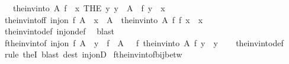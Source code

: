 \begin{isabellebody}
\ \ \ {\isachardoublequoteopen}the{\isacharunderscore}{\kern0pt}inv{\isacharunderscore}{\kern0pt}into\ A\ f\ {\isacharequal}{\kern0pt}\ {\isacharparenleft}{\kern0pt}{\isasymlambda}x{\isachardot}{\kern0pt}\ THE\ y{\isachardot}{\kern0pt}\ y\ {\isasymin}\ A\ {\isasymand}\ f\ y\ {\isacharequal}{\kern0pt}\ x{\isacharparenright}{\kern0pt}{\isachardoublequoteclose}\isanewline
\isanewline
{}\isamarkupfalse%
\ the{\isacharunderscore}{\kern0pt}inv{\isacharunderscore}{\kern0pt}into{\isacharunderscore}{\kern0pt}f{\isacharunderscore}{\kern0pt}f{\isacharcolon}{\kern0pt}\ {\isachardoublequoteopen}inj{\isacharunderscore}{\kern0pt}on\ f\ A\ {\isasymLongrightarrow}\ x\ {\isasymin}\ A\ {\isasymLongrightarrow}\ the{\isacharunderscore}{\kern0pt}inv{\isacharunderscore}{\kern0pt}into\ A\ f\ {\isacharparenleft}{\kern0pt}f\ x{\isacharparenright}{\kern0pt}\ {\isacharequal}{\kern0pt}\ x{\isachardoublequoteclose}\isanewline
%
\isadelimproof
\ \ %
\endisadelimproof
%
\isatagproof
{}\isamarkupfalse%
\ the{\isacharunderscore}{\kern0pt}inv{\isacharunderscore}{\kern0pt}into{\isacharunderscore}{\kern0pt}def\ inj{\isacharunderscore}{\kern0pt}on{\isacharunderscore}{\kern0pt}def\ \isamarkupfalse%
\ blast%
\endisatagproof
{\isafoldproof}%
%
\isadelimproof
\isanewline
%
\endisadelimproof
\isanewline
{}\isamarkupfalse%
\ f{\isacharunderscore}{\kern0pt}the{\isacharunderscore}{\kern0pt}inv{\isacharunderscore}{\kern0pt}into{\isacharunderscore}{\kern0pt}f{\isacharcolon}{\kern0pt}\ {\isachardoublequoteopen}inj{\isacharunderscore}{\kern0pt}on\ f\ A\ {\isasymLongrightarrow}\ y\ {\isasymin}\ f\ {\isacharbackquote}{\kern0pt}\ A\ \ {\isasymLongrightarrow}\ f\ {\isacharparenleft}{\kern0pt}the{\isacharunderscore}{\kern0pt}inv{\isacharunderscore}{\kern0pt}into\ A\ f\ y{\isacharparenright}{\kern0pt}\ {\isacharequal}{\kern0pt}\ y{\isachardoublequoteclose}\isanewline
%
\isadelimproof
\ \ %
\endisadelimproof
%
\isatagproof
{}\isamarkupfalse%
\ the{\isacharunderscore}{\kern0pt}inv{\isacharunderscore}{\kern0pt}into{\isacharunderscore}{\kern0pt}def\isanewline
\ \ \isamarkupfalse%
\ {\isacharparenleft}{\kern0pt}rule\ the{}I{}{\isacharsemicolon}{\kern0pt}\ blast\ dest{\isacharcolon}{\kern0pt}\ inj{\isacharunderscore}{\kern0pt}onD{\isacharparenright}{\kern0pt}%
\endisatagproof
{\isafoldproof}%
%
\isadelimproof
\isanewline
%
\endisadelimproof
\isanewline
{}\isamarkupfalse%
\ f{\isacharunderscore}{\kern0pt}the{\isacharunderscore}{\kern0pt}inv{\isacharunderscore}{\kern0pt}into{\isacharunderscore}{\kern0pt}f{\isacharunderscore}{\kern0pt}bij{\isacharunderscore}{\kern0pt}betw{\isacharcolon}{\kern0pt}\isanewline

\end{isabellebody}

